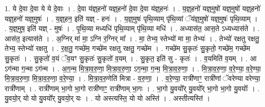 \documentclass[17pt]{extarticle}
\begin{document}
1. ये दे॒वा दे॒वा ये ये दे॒वाः । . दे॒वा य॑ज्ञ्॒हनो॑ यज्ञ्॒हनो॑ दे॒वा दे॒वा य॑ज्ञ्॒हनः॑ । . य॒ज्ञ्॒हनो॑ यज्ञ्॒मुषो॑ यज्ञ्॒मुषो॑ यज्ञ्॒हनो॑ यज्ञ्॒हनो॑ यज्ञ्॒मुषः॑ । . य॒ज्ञ्॒हन॒ इति॑ यज्ञ् - हनः॑ । . य॒ज्ञ्॒मुषः॑ पृथि॒व्याम् पृ॑थि॒व्यां ॅय॑ज्ञ्॒मुषो॑ यज्ञ्॒मुषः॑ पृथि॒व्याम् । . य॒ज्ञ्॒मुष॒ इति॑ यज्ञ् - मुषः॑ । . पृ॒थि॒व्या मध्यधि॑ पृथि॒व्याम् पृ॑थि॒व्या मधि॑ । . अध्यास॑त॒ आस॒ते ऽध्यध्यास॑ते । . आस॑त॒ इत्यास॑ते । . अ॒ग्निर् मा॑ मा॒ ऽग्नि र॒ग्निर् मा᳚ । . मा॒ तेभ्य॒ स्तेभ्यो॑ मा मा॒ तेभ्यः॑ । . तेभ्यो॑ रक्षतु रक्षतु॒ तेभ्य॒ स्तेभ्यो॑ रक्षतु । . र॒क्ष॒तु॒ गच्छे॑म॒ गच्छे॑म रक्षतु रक्षतु॒ गच्छे॑म । . गच्छे॑म सु॒कृतः॑ सु॒कृतो॒ गच्छे॑म॒ गच्छे॑म सु॒कृतः॑ । . सु॒कृतो॑ व॒यं ॅव॒यꣳ सु॒कृतः॑ सु॒कृतो॑ व॒यम् । . सु॒कृत॒ इति॑ सु - कृतः॑ । . व॒यमिति॑ व॒यम् । . आ ऽग॑न्मा ग॒न्मा ऽग॑न्म । . अ॒ग॒न्म॒ मि॒त्रा॒व॒रु॒णा॒ मि॒त्रा॒व॒रु॒णा॒ ऽग॒न्मा॒ ग॒न्म॒ मि॒त्रा॒व॒रु॒णा॒ । . मि॒त्रा॒व॒रु॒णा॒ व॒रे॒ण्या॒ व॒रे॒ण्या॒ मि॒त्रा॒व॒रु॒णा॒ मि॒त्रा॒व॒रु॒णा॒ व॒रे॒ण्या॒ । . मि॒त्रा॒व॒रु॒णेति॑ मित्रा - व॒रु॒णा॒ । . व॒रे॒ण्या॒ रात्री॑णाꣳ॒॒ रात्री॑णां ॅवरेण्या वरेण्या॒ रात्री॑णाम् । . रात्री॑णाम् भा॒गो भा॒गो रात्री॑णाꣳ॒॒ रात्री॑णाम् भा॒गः । . भा॒गो यु॒वयो᳚र् यु॒वयो᳚र् भा॒गो भा॒गो यु॒वयोः᳚ । . यु॒वयो॒र् यो यो यु॒वयो᳚र् यु॒वयो॒र् यः । . यो अस्त्यस्ति॒ यो यो अस्ति॑ । . अस्तीत्यस्ति॑ । \newline
\end{document}
